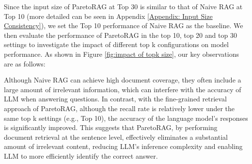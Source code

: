 Since the input size of ParetoRAG at Top 30 is similar to that of Naive RAG at Top 10 (more detailed can be seen in Appendix \ref{Appendix: Input Size Consistency}), we set the Top 10 performance of Naive RAG as the baseline. We then evaluate the performance of ParetoRAG in the top 10, top 20 and top 30 settings to investigate the impact of different top k configurations on model performance. As shown in Figure \ref{fig:impact of topk size}, our key observations are as follows:
\par
Although Naive RAG can achieve high document coverage, they often include a large amount of irrelevant information, which can interfere with the accuracy of LLM when answering questions. In contrast, with the fine-grained retrieval approach of ParetoRAG, although the recall rate is relatively lower under the same top k settings (e.g., Top 10), the accuracy of the language model's responses is significantly improved. This suggests that ParetoRAG, by performing document retrieval at the sentence level, effectively eliminates a substantial amount of irrelevant content, reducing LLM's inference complexity and enabling LLM to more efficiently identify the correct answer.
\par

